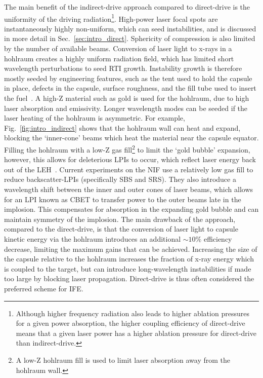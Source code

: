 The main benefit of the indirect-drive approach compared to direct-drive is the uniformity of the driving radiation\footnote{Although higher frequency radiation also leads to higher ablation pressures for a given power absorption, the higher coupling efficiency of direct-drive means that a given laser power has a higher ablation pressure for direct-drive than indirect-drive.}.
High-power laser focal spots are instantaneously highly non-uniform, which can seed instabilities, and is discussed in more detail in Sec.~\ref{sec:intro_direct}. 
Sphericity of compression is also limited by the number of available beams.
Conversion of laser light to x-rays in a hohlraum creates a highly uniform radiation field, which has limited short wavelength perturbations to seed \ac{RTI} growth.
Instability growth is therefore mostly seeded by engineering features, such as the tent used to hold the capsule in place, defects in the capsule, surface roughness, and the fill tube used to insert the fuel~\cite{clark_threedimensional_2016}.
A high-Z material such as gold is used for the hohlraum, due to high laser absorption and emissivity.
Longer wavelength modes can be seeded if the laser heating of the hohlraum is asymmetric.
For example, Fig.~\ref{fig:intro_indirect} shows that the hohlraum wall can heat and expand, blocking the `inner-cone' beams which heat the material near the capsule equator.
Filling the hohlraum with a low-Z gas fill\footnote{A low-Z hohlraum fill is used to limit laser absorption away from the hohlraum wall.} to limit the `gold bubble' expansion, however, this allows for deleterious \ac{LPIs} to occur, which reflect laser energy back out of the \ac{LEH}~\cite{macgowan_laser_1996}.
Current experiments on the \ac{NIF} use a relatively low gas fill to reduce backscatter-\ac{LPIs} (specifically \ac{SBS} and \ac{SRS}).
They also introduce a wavelength shift between the inner and outer cones of laser beams, which allows for an \ac{LPI} known as \ac{CBET} to transfer power to the outer beams late in the implosion\cite{michel_tuning_2009,moody_multistep_2012,kritcher_energy_2018}.
This compensates for absorption in the expanding gold bubble and can maintain symmetry of the implosion.
The main drawback of the approach, compared to the direct-drive, is that the conversion of laser light to capsule kinetic energy via the hohlraum introduces an additional $\sim10\%$ efficiency decrease, limiting the maximum gains that can be achieved.
Increasing the size of the capsule relative to the hohlraum increases the fraction of x-ray energy which is coupled to the target, but can introduce long-wavelength instabilities if made too large by blocking laser propagation.
Direct-drive is thus often considered the preferred scheme for \ac{IFE}.

